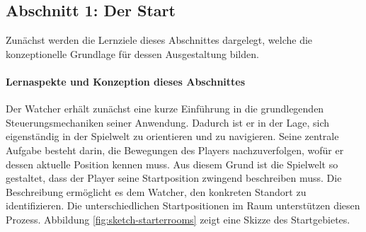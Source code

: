 

\subsection{Abschnitt 1: Der Start}
Zunächst werden die Lernziele dieses Abschnittes dargelegt, welche die konzeptionelle Grundlage für dessen Ausgestaltung bilden.


\paragraph{Lernaspekte und Konzeption dieses Abschnittes}

Der Watcher erhält zunächst eine kurze Einführung in die grundlegenden Steuerungsmechaniken seiner Anwendung. Dadurch ist er in der Lage, sich eigenständig in der Spielwelt zu orientieren und zu navigieren. Seine zentrale Aufgabe besteht darin, die Bewegungen des Players nachzuverfolgen, wofür er dessen aktuelle Position kennen muss. Aus diesem Grund ist die Spielwelt so gestaltet, dass der Player seine Startposition zwingend beschreiben muss. Die Beschreibung ermöglicht es dem Watcher, den konkreten Standort zu identifizieren. Die unterschiedlichen Startpositionen im Raum unterstützen diesen Prozess. Abbildung \ref{fig:sketch-starterrooms} zeigt eine Skizze des Startgebietes.

